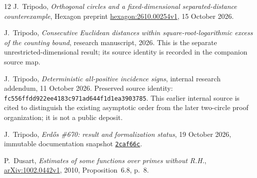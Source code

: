 \begin{thebibliography}{12}
J.~Tripodo, \emph{Orthogonal circles and a fixed-dimensional
separated-distance counterexample}, Hexagon preprint
\href{https://hexagonmath.org/2610.00254?version=1}{hexagon:2610.00254v1},
15 October 2026.

J.~Tripodo, \emph{Consecutive Euclidean distances within
square-root-logarithmic excess of the counting bound}, research manuscript, 2026. This is the separate unrestricted-dimensional
result; its source identity is recorded in the companion source map.

J.~Tripodo, \emph{Deterministic all-positive incidence signs},
internal research addendum, 11 October 2026.
Preserved source identity: \texttt{fc556ffdd922ee4183c971ad644f1d1ea3903785}.
This earlier internal source is cited to distinguish the existing asymptotic
order from the later two-circle proof organization; it is not a public deposit.

J.~Tripodo, \emph{Erd\H{o}s \#670: result and formalization status},
19 October 2026, immutable documentation snapshot
\href{https://github.com/jjtripodo-lgtm/erdos-670-fixed-dimension/blob/2caf66c312c5d498d17e1c150588684b66300e68/PUBLIC_STATUS.md}{\texttt{2caf66c}}.

P.~Dusart, \emph{Estimates of some functions over primes without R.H.},
\href{https://arxiv.org/abs/1002.0442v1}{arXiv:1002.0442v1}, 2010,
Proposition~6.8, p.~8.

\end{thebibliography}

